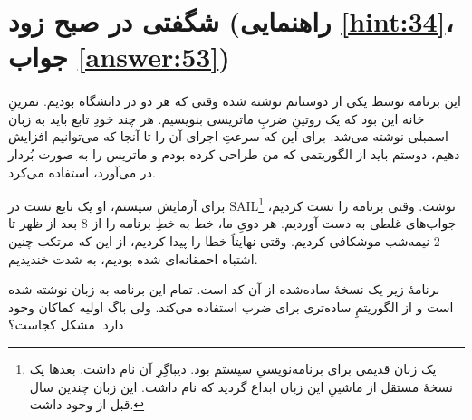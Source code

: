 \section[شگفتی در صبح زود]{شگفتی در صبح زود \protect{} (راهنمایی \ref{hint:34}، جواب \ref{answer:53})}
\paragraph{}\label{prog:3}
این برنامه توسط یکی از دوستانم نوشته شده وقتی که هر دو در دانشگاه بودیم. تمرینِ خانه این بود که یک روتینِ ضربِ ماتریسی بنویسیم. هر چند خودِ تابع باید به زبان اسمبلی نوشته می‌شد. برای این که سرعتِ اجرای آن را تا آنجا که می‌توانیم افزایش دهیم، دوستم باید از الگوریتمی که من طراحی کرده بودم و ماتریس را به صورت بُردار در می‌آورد، استفاده می‌کرد.

برای آزمایش سیستم، او یک تابع تست در SAIL\footnote{ یک زبان قدیمی برای برنامه‌نویسیِ سیستم  بود. دیباگِرِ آن  نام داشت. بعدها یک نسخهٔ مستقل از ماشینِ این زبان ابداع گردید که  نام داشت. این زبان چندین سال قبل از  وجود داشت.} نوشت. وقتی برنامه را تست کردیم، جواب‌های غلطی به دست آوردیم. هر دویِ ما، خط به خطِ برنامه را از 8 بعد از ظهر تا 2 نیمه‌شب موشکافی کردیم. وقتی نهایتاً خطا را پیدا کردیم، از این که مرتکب چنین اشتباه احمقانه‌ای شده بودیم، به شدت خندیدیم.

برنامهٔ زیر یک نسخهٔ ساده‌شده از آن کد است. تمام این برنامه به زبان  نوشته شده است و از الگوریتمِ ساده‌تری برای ضرب استفاده می‌کند. ولی باگ اولیه کماکان وجود دارد. مشکل کجاست؟

